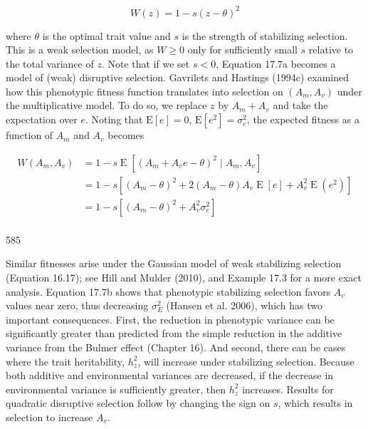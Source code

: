 \documentclass{article}
\begin{document}
\begin{equation}
W(z)=1-s(z-\theta)^{2}
\tag{17.7a}
\label{eq:17_7a}
\end{equation}

where  $ \theta $ is the optimal trait value and  $ s $ is the strength of stabilizing selection. This is a weak selection model, as  $ W \geq 0 $ only for sufficiently small  $ s $ relative to the total variance of  $ z $. Note that if we set  $ s < 0 $, Equation 17.7a becomes a model of (weak) disruptive selection. Gavrilets and Hastings (1994c) examined how this phenotypic fitness function translates into selection on  $ (A_m, A_v) $ under the multiplicative model. To do so, we replace  $ z $ by  $ A_m + A_v $ and take the expectation over  $ e $. Noting that  $ \mathrm{E}[e] = 0 $,  $ \mathrm{E}[e^2] = \sigma_e^2 $, the expected fitness as a function of  $ A_m $ and  $ A_v $ becomes

\begin{equation}
\begin{aligned}W(A_{m},A_{v})&=1-s\operatorname{E}\left[\left(A_{m}+A_{v}e-\theta\right)^{2}\mid A_{m},A_{v}\right]\\&=1-s\left[\left(A_{m}-\theta\right)^{2}+2(A_{m}-\theta)A_{v}\operatorname{E}\left[e\right]+A_{v}^{2}\operatorname{E}\left(e^{2}\right)\right]\\&=1-s\left[\left(A_{m}-\theta\right)^{2}+A_{v}^{2}\sigma_{e}^{2}\right]\\ \end{aligned}
\tag{17.7b}
\label{eq:17_7b}
\end{equation}

585

Similar fitnesses arise under the Gaussian model of weak stabilizing selection (Equation 16.17); see Hill and Mulder (2010), and Example 17.3 for a more exact analysis. Equation 17.7b shows that phenotypic stabilizing selection favors  $ A_v $ values near zero, thus decreasing  $ \sigma_E^2 $ (Hansen et al. 2006), which has two important consequences. First, the reduction in phenotypic variance can be significantly greater than predicted from the simple reduction in the additive variance from the Bulmer effect (Chapter 16). And second, there can be cases where the trait heritability,  $ h_z^2 $, will increase under stabilizing selection. Because both additive and environmental variances are decreased, if the decrease in environmental variance is sufficiently greater, then  $ h_z^2 $ increases. Results for quadratic disruptive selection follow by changing the sign on  $ s $, which results in selection to increase  $ A_v $.
\end{document}
